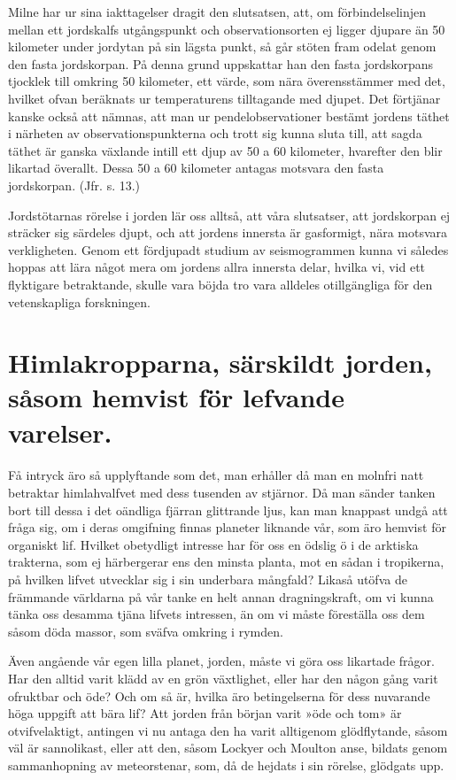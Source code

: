 \documentclass[a4paper, 12pt, oneside, swedish]{article}
\begin{document}
Milne har ur sina iakttagelser dragit den slutsatsen, att, om förbindelselinjen mellan ett jordskalfs utgångspunkt och observationsorten ej ligger djupare än 50 kilometer under jordytan på sin lägsta punkt, så går stöten fram odelat genom den fasta jordskorpan. På denna grund uppskattar han den fasta jordskorpans tjocklek till omkring 50 kilometer, ett värde, som nära överensstämmer med det, hvilket ofvan beräknats ur temperaturens tilltagande med djupet. Det förtjänar kanske också att nämnas, att man ur pendelobservationer bestämt jordens täthet i närheten av observationspunkterna och trott sig kunna sluta till, att sagda täthet är ganska växlande intill ett djup av 50 a 60 kilometer, hvarefter den blir likartad överallt. Dessa 50 a 60 kilometer antagas motsvara den fasta jordskorpan. (Jfr. s. 13.)

Jordstötarnas rörelse i jorden lär oss alltså, att våra slutsatser, att jordskorpan ej sträcker sig särdeles djupt, och att jordens innersta är gasformigt, nära motsvara verkligheten. Genom ett fördjupadt studium av seismogrammen kunna vi således hoppas att lära något mera om jordens allra innersta delar, hvilka vi, vid ett flyktigare betraktande, skulle vara böjda tro vara alldeles otillgängliga för den vetenskapliga forskningen.
\clearpage
\section{Himlakropparna, särskildt jorden, såsom hemvist för lefvande varelser.}
\paragraph{}
Få intryck äro så upplyftande som det, man erhåller då man en molnfri natt betraktar himlahvalfvet med dess tusenden av stjärnor. Då man sänder tanken bort till dessa i det oändliga fjärran glittrande ljus, kan man knappast undgå att fråga sig, om i deras omgifning finnas planeter liknande vår, som äro hemvist för organiskt lif. Hvilket obetydligt intresse har för oss en ödslig ö i de arktiska trakterna, som ej härbergerar ens den minsta planta, mot en sådan i tropikerna, på hvilken lifvet utvecklar sig i sin underbara mångfald? Likaså utöfva de främmande världarna på vår tanke en helt annan dragningskraft, om vi kunna tänka oss desamma tjäna lifvets intressen, än om vi måste föreställa oss dem såsom döda massor, som sväfva omkring i rymden.

Även angående vår egen lilla planet, jorden, måste vi göra oss likartade frågor. Har den alltid varit klädd av en grön växtlighet, eller har den någon gång varit ofruktbar och öde? Och om så är, hvilka äro betingelserna för dess nuvarande höga uppgift att bära lif? Att jorden från början varit »öde och tom» är otvifvelaktigt, antingen vi nu antaga den ha varit alltigenom glödflytande, såsom väl är sannolikast, eller att den, såsom Lockyer och Moulton anse, bildats genom sammanhopning av meteorstenar, som, då de hejdats i sin rörelse, glödgats upp.
\end{document}
